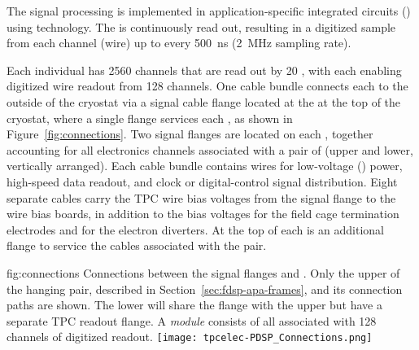 The  signal processing is implemented in application-specific integrated circuits ()
using  technology.  The  is continuously read out, resulting in a digitized 
sample from each  channel (wire) up to every \SI{500}{ns} (\SI{2}{MHz} sampling rate).

Each individual  has \num{2560} channels that are read out by \num{20} %
, with
each  enabling digitized wire readout from \num{128} channels.  One cable bundle connects each  to
the outside of the cryostat via a  signal cable flange located at the  \fdth at the
top of the cryostat, where a single flange services each , as shown in Figure~\ref{fig:connections}.  Two  signal flanges are located on each \fdth, together accounting for all electronics channels associated with a pair of  (upper and lower, vertically arranged).
Each cable bundle contains wires for low-voltage () power, high-speed data readout, and
clock or digital-control signal distribution.  Eight separate cables carry the TPC wire bias voltages
from the signal flange to the  wire bias boards, in addition to the bias voltages for the field
cage termination electrodes and for the electron diverters.  At the top of each \fdth is an additional flange to service the  cables associated with the  pair.

\begin{dunefigure}
{fig:connections}
{Connections between the signal flanges and . Only the upper  of the hanging  pair, described in Section~\ref{sec:fdsp-apa-frames}, and its connection paths are shown. The lower  will share the  flange with the upper  but have a separate TPC readout flange. A \textit{ module} consists of all  associated with \num{128} channels of digitized readout.}
\texttt{[image: tpcelec-PDSP\_Connections.png]}
\end{dunefigure}

